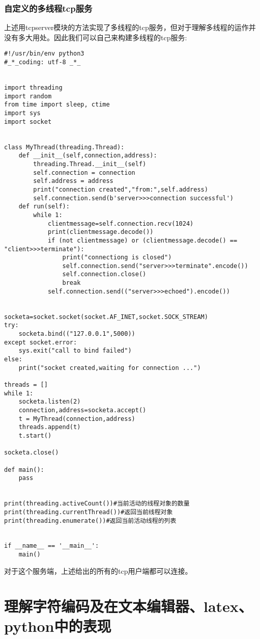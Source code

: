 \documentclass[twoside,11pt]{book}
\begin{document}
\subsection{自定义的多线程tcp服务}
上述用tcpserver模块的方法实现了多线程的tcp服务，但对于理解多线程的运作并没有多大用处。因此我们可以自己来构建多线程的tcp服务:
\begin{lstlisting}
#!/usr/bin/env python3
#_*_coding: utf-8 _*_


import threading
import random
from time import sleep, ctime
import sys
import socket


class MyThread(threading.Thread):
    def __init__(self,connection,address):
        threading.Thread.__init__(self)
        self.connection = connection
        self.address = address
        print("connection created","from:",self.address)
        self.connection.send(b'server>>>connection successful')
    def run(self):
        while 1:
            clientmessage=self.connection.recv(1024)
            print(clientmessage.decode())
            if (not clientmessage) or (clientmessage.decode() == "client>>>terminate"):
                print("connectiong is closed")
                self.connection.send("server>>>terminate".encode())
                self.connection.close()
                break
            self.connection.send(("server>>>echoed").encode())


socketa=socket.socket(socket.AF_INET,socket.SOCK_STREAM)
try:
    socketa.bind(("127.0.0.1",5000))
except socket.error:
    sys.exit("call to bind failed")
else:
    print("socket created,waiting for connection ...")

threads = []
while 1:
    socketa.listen(2)
    connection,address=socketa.accept()
    t = MyThread(connection,address)
    threads.append(t)
    t.start()

socketa.close()

def main():
    pass


print(threading.activeCount())#当前活动的线程对象的数量
print(threading.currentThread())#返回当前线程对象
print(threading.enumerate())#返回当前活动线程的列表


if __name__ == '__main__':
    main()

\end{lstlisting}

对于这个服务端，上述给出的所有的tcp用户端都可以连接。




\chapter{理解字符编码及在文本编辑器、latex、python中的表现}
\end{document}

